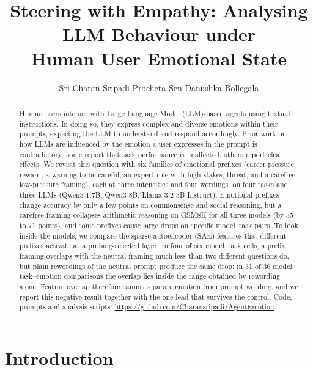 \documentclass[11pt]{article}
\title{Steering with Empathy: Analysing LLM Behaviour under\\Human User Emotional State}
\author{Sri Charan Sripadi \And Procheta Sen \And Danushka Bollegala}
\begin{document}
\maketitle

\begin{abstract}
Human users interact with Large Language Model (LLM)-based agents using textual instructions. In doing so, they express complex and diverse emotions within their prompts, expecting the LLM to understand and respond accordingly. Prior work on how LLMs are influenced by the emotion a user expresses in the prompt is contradictory: some report that task performance is unaffected, others report clear effects. We revisit this question with six families of emotional prefixes (career pressure, reward, a warning to be careful, an expert role with high stakes, threat, and a carefree low-pressure framing), each at three intensities and four wordings, on four tasks and three LLMs (Qwen3-1.7B, Qwen3-8B, Llama-3.2-3B-Instruct). Emotional prefixes change accuracy by only a few points on commonsense and social reasoning, but a carefree framing collapses arithmetic reasoning on GSM8K for all three models (by 35 to 71 points), and some prefixes cause large drops on specific model--task pairs. To look inside the models, we compare the sparse-autoencoder (SAE) features that different prefixes activate at a probing-selected layer. In four of six model--task cells, a prefix framing overlaps with the neutral framing much less than two different questions do, but plain rewordings of the neutral prompt produce the same drop: in 31 of 36 model--task--emotion comparisons the overlap lies inside the range obtained by rewording alone. Feature overlap therefore cannot separate emotion from prompt wording, and we report this negative result together with the one lead that survives the control. Code, prompts and analysis scripts: \url{https://github.com/Charansripadi/AgentEmotion}.
\end{abstract}

\section{Introduction}
\end{document}
